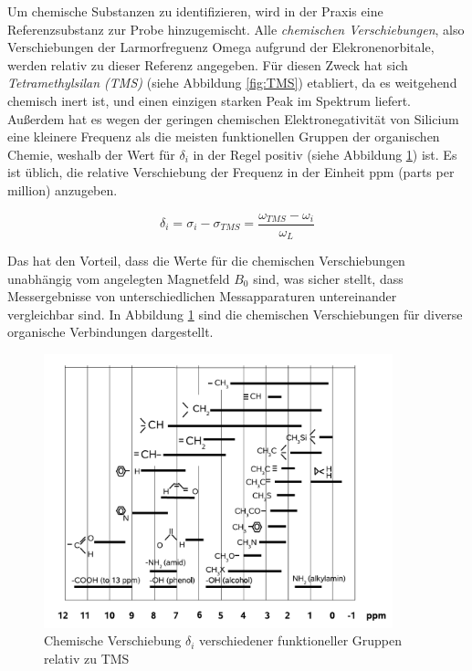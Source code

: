\documentclass[a4paper]{scrartcl} %
\begin{document}
Um chemische Substanzen zu identifizieren, wird in der Praxis eine Referenzsubstanz zur Probe hinzugemischt. Alle \emph{chemischen Verschiebungen}, also Verschiebungen der Larmorfreguenz Omega aufgrund der Elekronenorbitale, werden relativ zu dieser Referenz angegeben. Für diesen Zweck hat sich \emph{Tetramethylsilan (TMS)} \autocite{TMS} (siehe Abbildung \ref{fig:TMS}) etabliert, da es weitgehend chemisch inert ist, und einen einzigen starken Peak im Spektrum liefert. Außerdem hat es wegen der geringen chemischen Elektronegativität von Silicium eine kleinere Frequenz als die meisten funktionellen Gruppen der organischen Chemie, weshalb der Wert für $\delta_i$ in der Regel positiv (siehe Abbildung \ref{fig:chem_shift}) ist. Es ist üblich, die relative Verschiebung der Frequenz in der Einheit ppm (parts per million) anzugeben.

\begin{equation}
	\delta_i = \sigma_i -\sigma_{TMS} = \frac{\omega_{TMS} - \omega_i}{\omega_L}
	\label{eq:delta_i}
\end{equation}

Das hat den Vorteil, dass die Werte für die chemischen Verschiebungen unabhängig vom angelegten Magnetfeld $B_0$ sind, was sicher stellt, dass Messergebnisse von unterschiedlichen Messapparaturen untereinander vergleichbar sind.
In Abbildung \ref{fig:chem_shift} sind die chemischen Verschiebungen für diverse organische Verbindungen dargestellt.

\begin{figure}[htbp]
	\centering
	\includegraphics[width= 0.9\textwidth]{./Resources/chem_shifts.png}
	\caption{Chemische Verschiebung $\delta_i$ verschiedener funktioneller Gruppen relativ zu TMS \autocite{skript}}
	\label{fig:chem_shift}
\end{figure}
\end{document}
